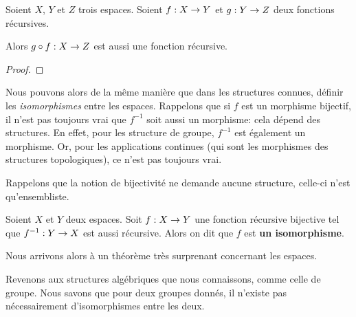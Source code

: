 \begin{proposition}
	Soient $X$, $Y$ et $Z$ trois espaces.
	Soient $f : X \rightarrow Y$ et $g : Y \rightarrow Z$ deux fonctions
	récursives.

	Alors $g \circ f : X \rightarrow Z$ est aussi une fonction récursive.
\end{proposition}

\ifdefined\outproof
\begin{proof}

\end{proof}
\fi

Nous pouvons alors de la même manière que dans les structures connues, définir
les \textit{isomorphismes} entre les espaces.
Rappelons que si $f$ est un morphisme bijectif, il n'est pas toujours vrai que
$f^{-1}$ soit aussi un morphisme: cela dépend des structures. En effet, pour les
structure de groupe, $f^{-1}$ est également un morphisme. Or, pour les
applications continues (qui sont les morphismes des structures topologiques),
ce n'est pas toujours vrai.

Rappelons que la notion de bijectivité ne demande aucune structure, celle-ci
n'est qu'ensembliste.

\begin{definition}
	Soient $X$ et $Y$ deux espaces.
	Soit $f : X \rightarrow Y$ une fonction récursive bijective tel que
	$f^{-1} : Y \rightarrow X$ est aussi récursive.
	Alors on dit que $f$ est \textbf{un isomorphisme}.
\end{definition}

Nous arrivons alors à un théorème très surprenant concernant les espaces.

Revenons aux structures algébriques que nous connaissons, comme celle de groupe.
Nous savons que pour deux groupes donnés, il n'existe pas nécessairement
d'isomorphismes entre les deux.
